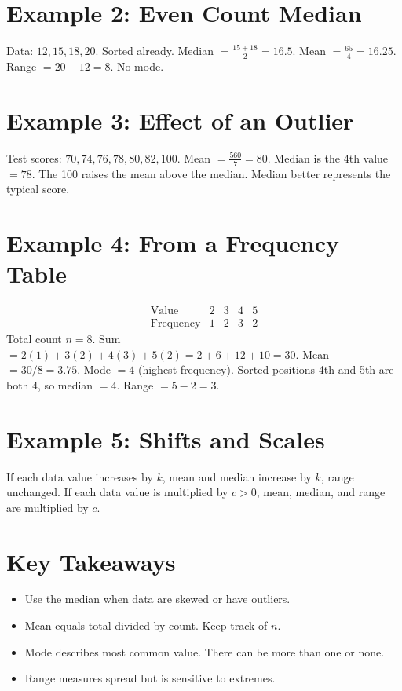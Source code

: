 \documentclass[12pt]{article}
\begin{document}
\section*{Example 2: Even Count Median}

Data: \(12, 15, 18, 20\). Sorted already.  
Median \(=\frac{15+18}{2}=16.5\).  
Mean \(=\frac{65}{4}=16.25\). Range \(=20-12=8\). No mode.

\section*{Example 3: Effect of an Outlier}

Test scores: \(70, 74, 76, 78, 80, 82, 100\).  
Mean \(=\frac{560}{7}=80\). Median is the 4th value \(=78\).  
The 100 raises the mean above the median. Median better represents the typical score.

\section*{Example 4: From a Frequency Table}

\[
\begin{array}{c|cccc}
\text{Value} & 2 & 3 & 4 & 5\\ \hline
\text{Frequency} & 1 & 2 & 3 & 2
\end{array}
\]
Total count \(n=8\). Sum \(=2(1)+3(2)+4(3)+5(2)=2+6+12+10=30\).  
Mean \(=30/8=3.75\). Mode \(=4\) (highest frequency).  
Sorted positions 4th and 5th are both 4, so median \(=4\). Range \(=5-2=3\).

\section*{Example 5: Shifts and Scales}

If each data value increases by \(k\), mean and median increase by \(k\), range unchanged.  
If each data value is multiplied by \(c>0\), mean, median, and range are multiplied by \(c\).

\section*{Key Takeaways}
\begin{itemize}
  \item Use the median when data are skewed or have outliers.
  \item Mean equals total divided by count. Keep track of \(n\).
  \item Mode describes most common value. There can be more than one or none.
  \item Range measures spread but is sensitive to extremes.
\end{itemize}
\end{document}
